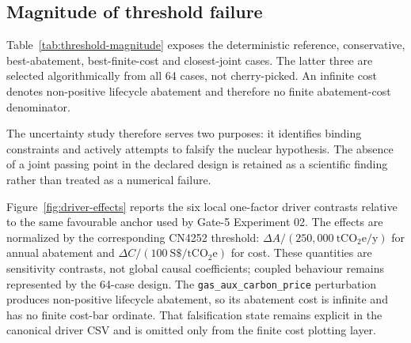 \subsection{Magnitude of threshold failure}
Table~\ref{tab:threshold-magnitude} exposes the deterministic reference, conservative, best-abatement, best-finite-cost and closest-joint cases. The latter three are selected algorithmically from all 64 cases, not cherry-picked. An infinite cost denotes non-positive lifecycle abatement and therefore no finite abatement-cost denominator.

\begin{table}[htbp]
\centering
\caption{Magnitude and direction of CN4252 threshold failure. Generated directly from canonical R3/Gate-5 diagnostics.}
\label{tab:threshold-magnitude}
\scriptsize
{}
\end{table}

The uncertainty study therefore serves two purposes: it identifies binding constraints and actively attempts to falsify the nuclear hypothesis. The absence of a joint passing point in the declared design is retained as a scientific finding rather than treated as a numerical failure.

Figure~\ref{fig:driver-effects} reports the six local one-factor driver contrasts relative to the same favourable anchor used by Gate-5 Experiment 02. The effects are normalized by the corresponding CN4252 threshold: \(\Delta A/(250{,}000~\mathrm{tCO_2e/y})\) for annual abatement and \(\Delta C/(100~\mathrm{S\$/tCO_2e})\) for cost. These quantities are sensitivity contrasts, not global causal coefficients; coupled behaviour remains represented by the 64-case design. The \texttt{gas\_aux\_carbon\_price} perturbation produces non-positive lifecycle abatement, so its abatement cost is infinite and has no finite cost-bar ordinate. That falsification state remains explicit in the canonical driver CSV and is omitted only from the finite cost plotting layer.

